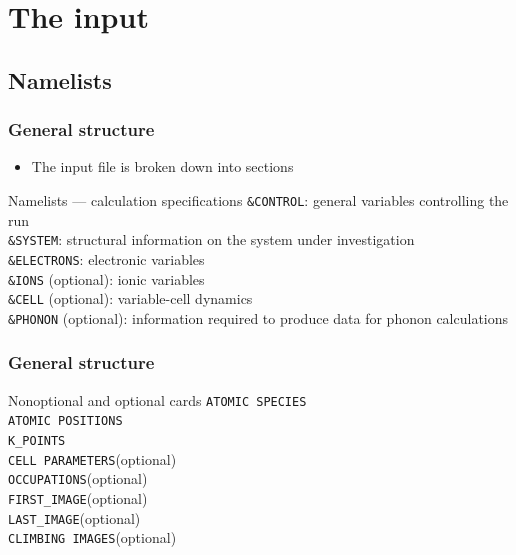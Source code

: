 \documentclass[]{beamer}
\begin{document}
\section{The input}
\subsection{Namelists}
\begin{frame}
\frametitle{General structure}
\begin{itemize}
\item The input file is broken down into sections
\end{itemize}
\begin{block}{Namelists --- calculation specifications}
  \texttt{\&CONTROL}: general variables controlling the run\\
  \texttt{\&SYSTEM}: structural information on the system under investigation\\
  \texttt{\&ELECTRONS}: electronic variables\\
  \texttt{\&IONS} (optional): ionic variables\\
  \texttt{\&CELL} (optional): variable-cell dynamics\\
  \texttt{\&PHONON} (optional): information required to produce data for
  phonon calculations\\
\end{block}
\end{frame}

\begin{frame}
\frametitle{General structure}
\begin{block}{Nonoptional and optional cards}
  \texttt{ATOMIC SPECIES}\\
  \texttt{ATOMIC POSITIONS}\\
  \texttt{K\_POINTS}\\
  \texttt{CELL PARAMETERS}(optional)\\
  \texttt{OCCUPATIONS}(optional)\\
  \texttt{FIRST\_IMAGE}(optional)\\
  \texttt{LAST\_IMAGE}(optional)\\
  \texttt{CLIMBING IMAGES}(optional)\\
\end{block}
\end{frame}
\end{document}
